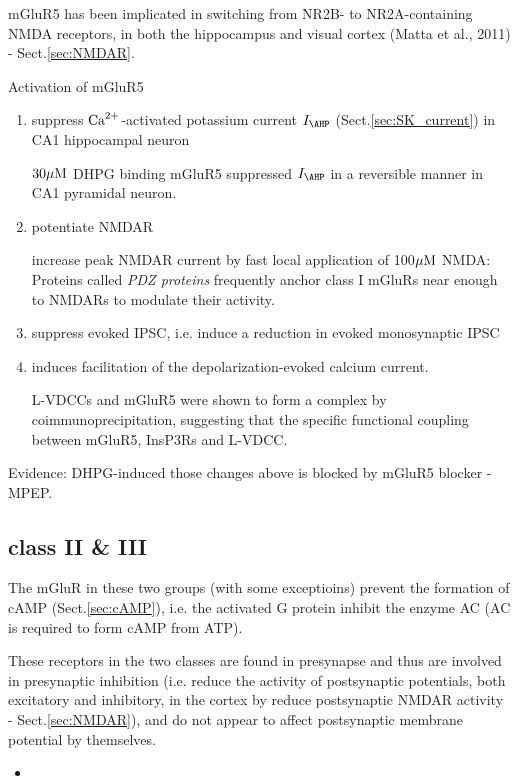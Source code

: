 mGluR5 has been implicated in switching from NR2B- to NR2A-containing NMDA
receptors, in both the hippocampus and visual cortex (Matta et al., 2011) -
Sect.\ref{sec:NMDAR}.

Activation of mGluR5
\begin{enumerate}
  \item suppress ${\text{Ca}^{2+}}$-activated potassium current $I_\AHP$
  (Sect.\ref{sec:SK_current}) in CA1 hippocampal neuron

  $30{\mu\text{M}}$ DHPG binding mGluR5 suppressed $I_\AHP$ in a reversible manner in CA1
  pyramidal neuron.
  
   \item potentiate NMDAR

  increase peak NMDAR current by fast local application of
  100${\mu\text{M}}$ NMDA: Proteins called {\it PDZ proteins}
frequently anchor class I mGluRs near enough to NMDARs to modulate their activity.
   
   \item suppress evoked IPSC, i.e.  induce a reduction in
  evoked monosynaptic IPSC
    
   
   \item induces facilitation of the depolarization-evoked calcium
   current.
   
L-VDCCs and mGluR5 were shown to form a complex by coimmunoprecipitation,
suggesting that the specific functional coupling between mGluR5, InsP3Rs and
L-VDCC.
   
\end{enumerate}
\citep{mannaioni2001}

Evidence: DHPG-induced those changes above is blocked by mGluR5 blocker -
MPEP.
  


\subsection{class II \& III}
\label{sec:mGluR_group-3}
\label{sec:mGluR_group-2}

The mGluR in these two groups (with some exceptioins)
prevent the formation of cAMP (Sect.\ref{sec:cAMP}), i.e. the activated G
protein inhibit the enzyme AC (AC is required to form cAMP from ATP).

These receptors in the two classes are found in presynapse and thus are involved
in presynaptic inhibition (i.e. reduce the activity of postsynaptic potentials,
both excitatory and inhibitory, in the cortex by reduce postsynaptic NMDAR
activity - Sect.\ref{sec:NMDAR}), and do not appear to affect postsynaptic
membrane potential by themselves.
\begin{itemize}
  \item 
\end{itemize}


